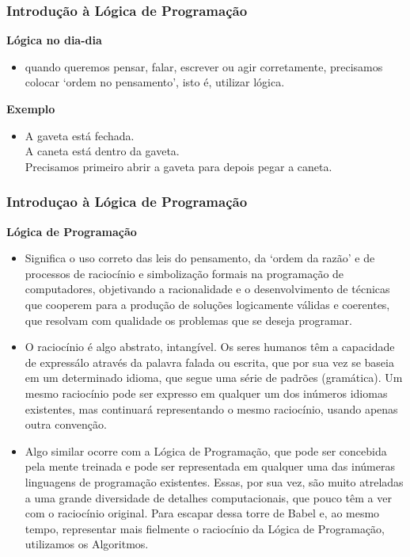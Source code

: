 \begin{frame}
	\frametitle{Introdução à Lógica de Programação}
	\textbf{Lógica no dia-dia}
	\begin{itemize}
		\item quando queremos pensar, falar, escrever ou agir corretamente, precisamos colocar ‘ordem no pensamento’, isto é, utilizar lógica.
	\end{itemize}
	
	\begin{block}{\textbf{Exemplo}}
		\begin{itemize}
			\item A gaveta está fechada.\\
			
			A caneta está dentro da gaveta.\\
			
			Precisamos primeiro abrir a gaveta para depois pegar a caneta.
		\end{itemize}
	\end{block}
\end{frame}











\begin{frame}
	\frametitle{Introduçao à Lógica de Programação}
	\textbf{Lógica de Programação}
	\begin{itemize}
		\item Significa o uso correto das leis do pensamento, da ‘ordem da razão’ e de processos de raciocínio e simbolização formais na programação de computadores, objetivando a racionalidade e o desenvolvimento de técnicas que cooperem para a produção de soluções logicamente válidas e coerentes, que resolvam com qualidade os problemas que se deseja programar.
		
		\item O raciocínio é algo abstrato, intangível. Os seres humanos têm a capacidade de expressálo através da palavra falada ou escrita, que por sua vez se baseia em um determinado idioma, que segue uma série de padrões (gramática). Um mesmo raciocínio pode ser expresso em qualquer um dos inúmeros idiomas existentes, mas continuará representando o mesmo raciocínio, usando apenas outra convenção.
		
		\item Algo similar ocorre com a Lógica de Programação, que pode ser concebida pela mente treinada e pode ser representada em qualquer uma das inúmeras linguagens de programação existentes. Essas, por sua vez, são muito atreladas a uma grande diversidade de detalhes computacionais, que pouco têm a ver com o raciocínio original. Para escapar dessa torre de Babel e, ao mesmo tempo, representar mais fielmente o raciocínio da Lógica de Programação, utilizamos os Algoritmos.
	\end{itemize}
\end{frame}




